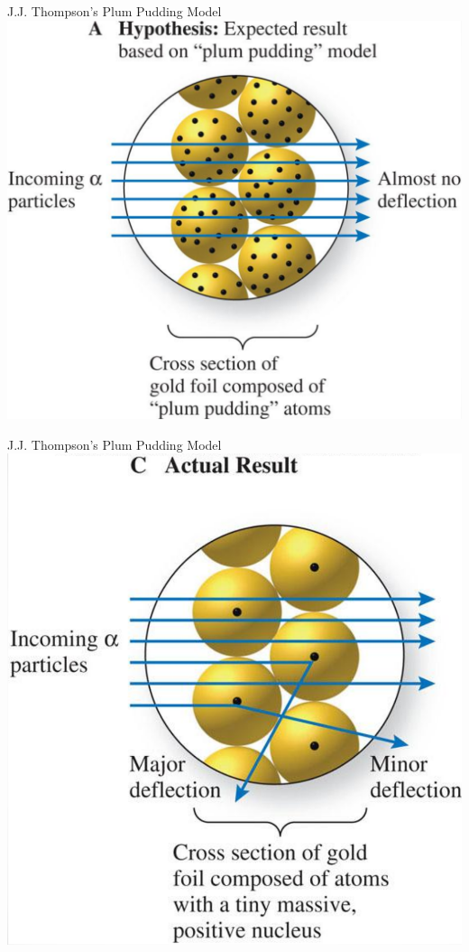 \documentclass[11pt]{beamer}
\begin{document}
\begin{frame}{J.J. Thompson's Plum Pudding Model}
  \centering
  \includegraphics[scale=0.15]{test_hypothesis}
\end{frame}

\begin{frame}{J.J. Thompson's Plum Pudding Model}
  \centering
  \includegraphics[scale=0.15]{reality}
\end{frame}
\end{document}
